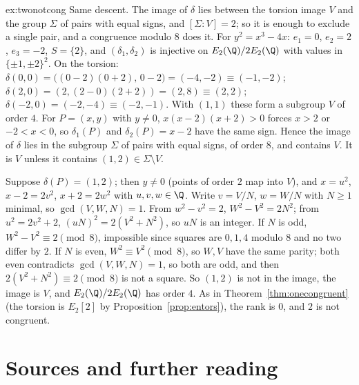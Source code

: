 \begin{solution}{ex:twonotcong}
\idea Same descent. The image of $\delta$ lies between the torsion image $V$ and the group $\Sigma$ of pairs with equal signs, and $[\Sigma:V]=2$; so it is enough to
exclude a single pair, and a congruence modulo $8$ does it.
\writeup For $y^2=x^3-4x$: $e_1=0$, $e_2=2$, $e_3=-2$, $S=\{2\}$, and $(\delta_1,\delta_2)$ is injective on $E_2(\Q)/2E_2(\Q)$ with values in $\{\pm1,\pm2\}^2$. On the torsion:
$\delta(0,0)=\bigl((0-2)(0+2),\,0-2\bigr)=(-4,-2)\equiv(-1,-2)$; $\delta(2,0)=(2,(2-0)(2+2))=(2,8)\equiv(2,2)$; $\delta(-2,0)=(-2,-4)\equiv(-2,-1)$. With $(1,1)$ these form
a subgroup $V$ of order $4$. For $P=(x,y)$ with $y\ne0$, $x(x-2)(x+2)>0$ forces $x>2$ or $-2<x<0$, so $\delta_1(P)$ and $\delta_2(P)=x-2$ have the same sign. Hence the
image of $\delta$ lies in the subgroup $\Sigma$ of pairs with equal signs, of order $8$, and contains $V$. It is $V$ unless it contains $(1,2)\in\Sigma\setminus V$.

Suppose $\delta(P)=(1,2)$; then $y\ne0$ (points of order $2$ map into $V$), and $x=u^2$, $x-2=2v^2$, $x+2=2w^2$ with $u,v,w\in\Q$. Write $v=V/N$, $w=W/N$ with
$N\ge1$ minimal, so $\gcd(V,W,N)=1$. From $w^2-v^2=2$, $W^2-V^2=2N^2$; from $u^2=2v^2+2$, $(uN)^2=2(V^2+N^2)$, so $uN$ is an integer. If $N$ is odd, $W^2-V^2\equiv2\pmod8$,
impossible since squares are $0,1,4$ modulo $8$ and no two differ by $2$. If $N$ is even, $W^2\equiv V^2\pmod8$, so $W,V$ have the same parity; both even contradicts
$\gcd(V,W,N)=1$, so both are odd, and then $2(V^2+N^2)\equiv2\pmod8$ is not a square. So $(1,2)$ is not in the image, the image is $V$, and $E_2(\Q)/2E_2(\Q)$ has order $4$.
As in Theorem~\ref{thm:onecongruent} (the torsion is $E_2[2]$ by Proposition~\ref{prop:entors}), the rank is $0$, and $2$ is not congruent.
\end{solution}

\section*{Sources and further reading}

